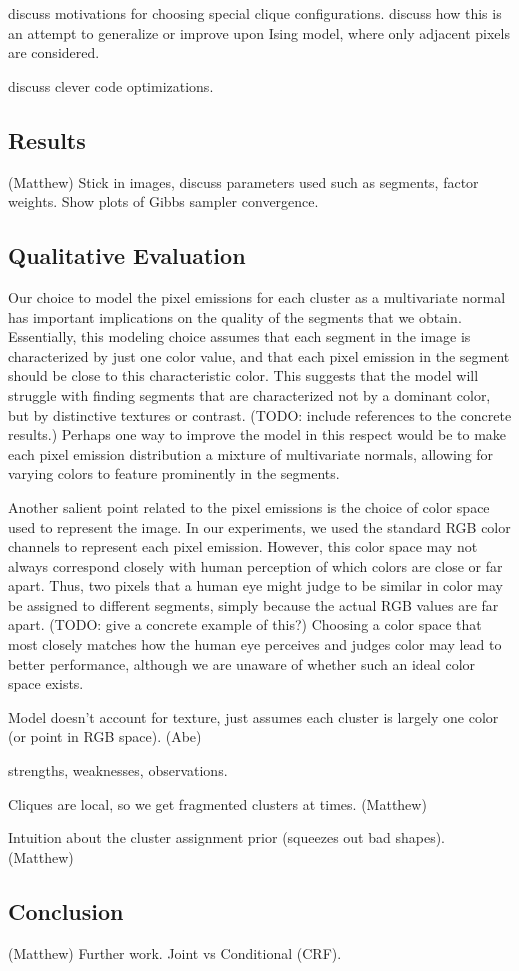 \documentclass[12pt]{article}
\begin{document}
discuss motivations for choosing special clique configurations.
discuss how this is an attempt to generalize or improve upon Ising model, where
only adjacent pixels are considered.

discuss clever code optimizations.

\subsection*{Results}(Matthew)
Stick in images, discuss parameters used such as segments, factor weights.
Show plots of Gibbs sampler convergence.


\subsection*{Qualitative Evaluation}
Our choice to model the pixel emissions for each cluster as a multivariate normal has important
implications on the quality of the segments that we obtain. 
Essentially, this modeling choice assumes that each segment in the image is characterized by just one
color value, and that each pixel emission in the segment should be close to this characteristic
color. This suggests that the model will struggle with finding segments that are characterized 
not by a dominant color, but by distinctive textures or contrast. (TODO: include references to 
the concrete results.) Perhaps one way to improve the model in this respect would be to make each
pixel emission distribution a mixture of multivariate normals, allowing for varying colors to feature
prominently in the segments.

Another salient point related to the pixel emissions is the choice of color space used to represent
the image. 
In our experiments, we used the standard RGB color channels to represent each pixel emission.
However, this color space may not always correspond closely with human perception of which colors are
close or far apart. 
Thus, two pixels that a human eye might judge to be similar in color may be assigned to different 
segments, simply because the actual RGB values are far apart. (TODO: give a concrete example of this?)
Choosing a color space that most closely matches how the human eye perceives and judges color may 
lead to better performance, although we are unaware of whether such an ideal color space exists. 


Model doesn't account for texture, just assumes each cluster is largely one color (or point
in RGB space). (Abe)


strengths, weaknesses, observations.

Cliques are local, so we get fragmented clusters at times. (Matthew)

Intuition about the cluster assignment prior (squeezes out bad shapes). (Matthew)







\subsection*{Conclusion} (Matthew)
Further work.
Joint vs Conditional (CRF).
\end{document}
